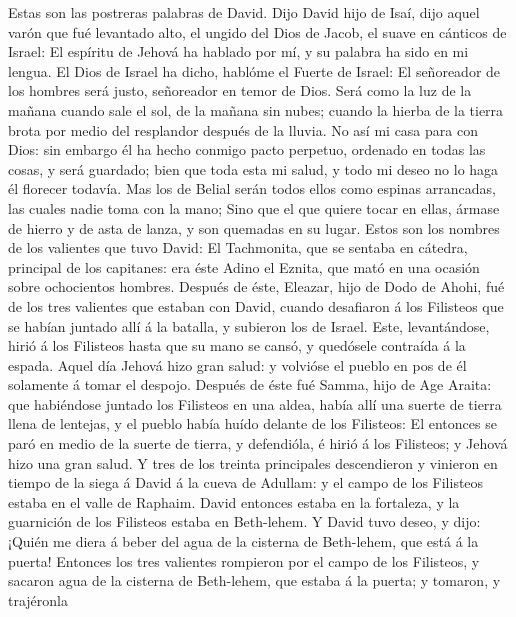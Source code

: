  Estas son las postreras palabras de David. Dijo David
hijo de Isaí, dijo aquel varón que fué levantado alto, el ungido del
Dios de Jacob, el suave en cánticos de Israel:  El
espíritu de Jehová ha hablado por mí, y su palabra ha sido en mi lengua.
 El Dios de Israel ha dicho, hablóme el Fuerte de Israel:
El señoreador de los hombres será justo, señoreador en temor de Dios.
 Será como la luz de la mañana cuando sale el sol, de la
mañana sin nubes; cuando la hierba de la tierra brota por medio del
resplandor después de la lluvia.  No así mi casa para con
Dios: sin embargo él ha hecho conmigo pacto perpetuo, ordenado en todas
las cosas, y será guardado; bien que toda esta mi salud, y todo mi deseo
no lo haga él florecer todavía.  Mas los de Belial serán
todos ellos como espinas arrancadas, las cuales nadie toma con la mano;
 Sino que el que quiere tocar en ellas, ármase de hierro y
de asta de lanza, y son quemadas en su lugar.  Estos son
los nombres de los valientes que tuvo David: El Tachmonita, que se
sentaba en cátedra, principal de los capitanes: era éste Adino el
Eznita, que mató en una ocasión sobre ochocientos hombres.
 Después de éste, Eleazar, hijo de Dodo de Ahohi, fué de
los tres valientes que estaban con David, cuando desafiaron á los
Filisteos que se habían juntado allí á la batalla, y subieron los de
Israel.  Este, levantándose, hirió á los Filisteos hasta
que su mano se cansó, y quedósele contraída á la espada. Aquel día
Jehová hizo gran salud: y volvióse el pueblo en pos de él solamente á
tomar el despojo.  Después de éste fué Samma, hijo de Age
Araita: que habiéndose juntado los Filisteos en una aldea, había allí
una suerte de tierra llena de lentejas, y el pueblo había huído delante
de los Filisteos:  El entonces se paró en medio de la
suerte de tierra, y defendióla, é hirió á los Filisteos; y Jehová hizo
una gran salud.  Y tres de los treinta principales
descendieron y vinieron en tiempo de la siega á David á la cueva de
Adullam: y el campo de los Filisteos estaba en el valle de Raphaim.
 David entonces estaba en la fortaleza, y la guarnición
de los Filisteos estaba en Beth-lehem.  Y David tuvo
deseo, y dijo: ¡Quién me diera á beber del agua de la cisterna de
Beth-lehem, que está á la puerta!  Entonces los tres
valientes rompieron por el campo de los Filisteos, y sacaron agua de la
cisterna de Beth-lehem, que estaba á la puerta; y tomaron, y trajéronla

